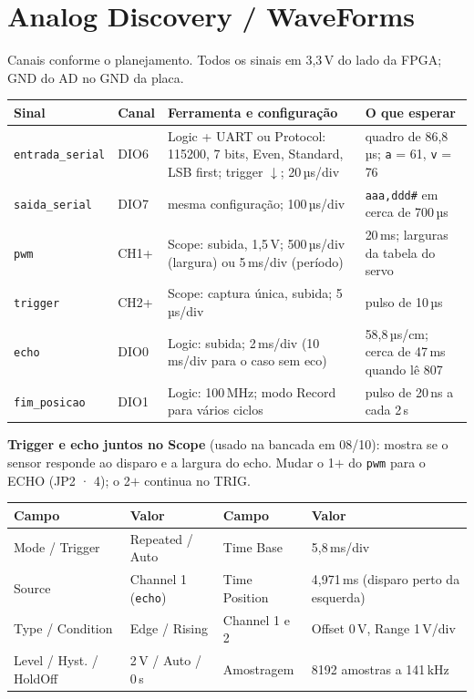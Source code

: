 \documentclass[9pt,a4paper]{extarticle}
\newcommand{\s}[1]{\texttt{#1}}          %
\begin{document}
\section{Analog Discovery / WaveForms}

Canais conforme o planejamento. Todos os sinais em 3,3\,V do lado da FPGA; GND
do AD no GND da placa.

\begin{tabularx}{\linewidth}{@{}l l Y Y@{}}
\toprule
Sinal & Canal & Ferramenta e configuração & O que esperar \\
\midrule
\s{entrada\_serial} & DIO6 & Logic + UART ou Protocol: 115200, 7 bits, Even, Standard, LSB first; trigger $\downarrow$; 20\,µs/div & quadro de 86,8\,µs; \s{a} = 61, \s{v} = 76 \\
\s{saida\_serial} & DIO7 & mesma configuração; 100\,µs/div & \s{aaa,ddd\#} em cerca de 700\,µs \\
\s{pwm} & CH1+ & Scope: subida, 1,5\,V; 500\,µs/div (largura) ou 5\,ms/div (período) & 20\,ms; larguras da tabela do servo \\
\s{trigger} & CH2+ & Scope: captura única, subida; 5\,µs/div & pulso de 10\,µs \\
\s{echo} & DIO0 & Logic: subida; 2\,ms/div (10\,ms/div para o caso sem eco) & 58,8\,µs/cm; cerca de 47\,ms quando lê 807 \\
\s{fim\_posicao} & DIO1 & Logic: 100\,MHz; modo Record para vários ciclos & pulso de 20\,ns a cada 2\,s \\
\bottomrule
\end{tabularx}

\textbf{Trigger e echo juntos no Scope} (usado na bancada em 08/10): mostra se o
sensor responde ao disparo e a largura do echo. Mudar o 1$+$ do \s{pwm} para o
ECHO (JP2 · 4); o 2$+$ continua no TRIG.

\begin{tabularx}{\linewidth}{@{}l Y l Y@{}}
\toprule
Campo & Valor & Campo & Valor \\
\midrule
Mode / Trigger & Repeated / Auto & Time Base & 5,8\,ms/div \\
Source & Channel 1 (\s{echo}) & Time Position & 4,971\,ms (disparo perto da esquerda) \\
Type / Condition & Edge / Rising & Channel 1 e 2 & Offset 0\,V, Range 1\,V/div \\
Level / Hyst. / HoldOff & 2\,V / Auto / 0\,s & Amostragem & 8192 amostras a 141\,kHz \\
\bottomrule
\end{tabularx}
\end{document}

